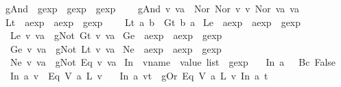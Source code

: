 \begin{isabellebody}
\isanewline
{}\isamarkupfalse%
\ gAnd\ {\isacharcolon}{\isacharcolon}\ {\isachardoublequoteopen}gexp\ {\isasymRightarrow}\ gexp\ {\isasymRightarrow}\ gexp{\isachardoublequoteclose}\ \ \isanewline
\ \ {\isachardoublequoteopen}gAnd\ v\ va\ {\isasymequiv}\ Nor\ {\isacharparenleft}Nor\ v\ v{\isacharparenright}\ {\isacharparenleft}Nor\ va\ va{\isacharparenright}{\isachardoublequoteclose}\isanewline
\isanewline
{}\isamarkupfalse%
\ Lt\ {\isacharcolon}{\isacharcolon}\ {\isachardoublequoteopen}aexp\ {\isasymRightarrow}\ aexp\ {\isasymRightarrow}\ gexp{\isachardoublequoteclose}\ \ \isanewline
\ \ {\isachardoublequoteopen}Lt\ a\ b\ {\isasymequiv}\ Gt\ b\ a{\isachardoublequoteclose}\isanewline
\isanewline
{}\isamarkupfalse%
\ Le\ {\isacharcolon}{\isacharcolon}\ {\isachardoublequoteopen}aexp\ {\isasymRightarrow}\ aexp\ {\isasymRightarrow}\ gexp{\isachardoublequoteclose}\ \ \isanewline
\ \ {\isachardoublequoteopen}Le\ v\ va\ {\isasymequiv}\ gNot\ {\isacharparenleft}Gt\ v\ va{\isacharparenright}{\isachardoublequoteclose}\isanewline
\isanewline
{}\isamarkupfalse%
\ Ge\ {\isacharcolon}{\isacharcolon}\ {\isachardoublequoteopen}aexp\ {\isasymRightarrow}\ aexp\ {\isasymRightarrow}\ gexp{\isachardoublequoteclose}\ \ \isanewline
\ \ {\isachardoublequoteopen}Ge\ v\ va\ {\isasymequiv}\ gNot\ {\isacharparenleft}Lt\ v\ va{\isacharparenright}{\isachardoublequoteclose}\isanewline
\isanewline
{}\isamarkupfalse%
\ Ne\ {\isacharcolon}{\isacharcolon}\ {\isachardoublequoteopen}aexp\ {\isasymRightarrow}\ aexp\ {\isasymRightarrow}\ gexp{\isachardoublequoteclose}\ \ \isanewline
\ \ {\isachardoublequoteopen}Ne\ v\ va\ {\isasymequiv}\ gNot\ {\isacharparenleft}Eq\ v\ va{\isacharparenright}{\isachardoublequoteclose}\isanewline
\isanewline
{}\isamarkupfalse%
\ In\ {\isacharcolon}{\isacharcolon}\ {\isachardoublequoteopen}vname\ {\isasymRightarrow}\ value\ list\ {\isasymRightarrow}\ gexp{\isachardoublequoteclose}\ \isanewline
\ \ {\isachardoublequoteopen}In\ a\ {\isacharbrackleft}{\isacharbrackright}\ {\isacharequal}\ Bc\ False{\isachardoublequoteclose}\ {\isacharbar}\isanewline
\ \ {\isachardoublequoteopen}In\ a\ {\isacharbrackleft}v{\isacharbrackright}\ {\isacharequal}\ Eq\ {\isacharparenleft}V\ a{\isacharparenright}\ {\isacharparenleft}L\ v{\isacharparenright}{\isachardoublequoteclose}\ {\isacharbar}\isanewline
\ \ {\isachardoublequoteopen}In\ a\ {\isacharparenleft}v{}{\isacharhash}t{\isacharparenright}\ {\isacharequal}\ gOr\ {\isacharparenleft}Eq\ {\isacharparenleft}V\ a{\isacharparenright}\ {\isacharparenleft}L\ v{}{\isacharparenright}{\isacharparenright}\ {\isacharparenleft}In\ a\ t{\isacharparenright}{\isachardoublequoteclose}\isanewline

\end{isabellebody}
